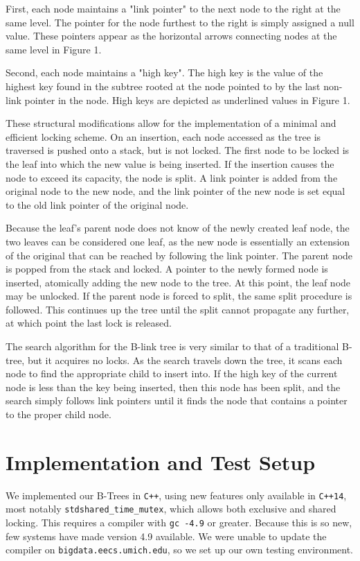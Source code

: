 \documentclass{sig-alternate}
\begin{document}
First, each node maintains a "link pointer" to the next node to the right at the same level. The pointer for the node furthest to the right is simply assigned a null value. These pointers appear as the horizontal arrows connecting nodes at the same level in Figure 1.

Second, each node maintains a "high key". The high key is the value of the highest key found in the subtree rooted at the node pointed to by the last non-link pointer in the node. High keys are depicted as underlined values in Figure 1.

These structural modifications allow for the implementation of a minimal and efficient locking scheme. On an insertion, each node accessed as the tree is traversed is pushed onto a stack, but is not locked. The first node to be locked is the leaf into which the new value is being inserted. If the insertion causes the node to exceed its capacity, the node is split. A link pointer is added from the original node to the new node, and the link pointer of the new node is set equal to the old link pointer of the original node.

Because the leaf's parent node does not know of the newly created leaf node, the two leaves can be considered one leaf, as the new node is essentially an extension of the original that can be reached by following the link pointer. The parent node is popped from the stack and locked. A pointer to the newly formed node is inserted, atomically adding the new node to the tree. At this point, the leaf node may be unlocked. If the parent node is forced to split, the same split procedure is followed. This continues up the tree until the split cannot propagate any further, at which point the last lock is released.

The search algorithm for the B-link tree is very similar to that of a traditional B-tree, but it acquires no locks. As the search travels down the tree, it scans each node to find the appropriate child to insert into. If the high key of the current node is less than the key being inserted, then this node has been split, and the search simply follows link pointers until it finds the node that contains a pointer to the proper child node.
\section{Implementation and Test Setup}
We implemented our B-Trees in \texttt{C++}, using new features only available in \texttt{C++14}, most notably \texttt{stdshared\_time\_mutex}, which allows both exclusive and shared locking.  This requires a compiler with \texttt{gc -4.9} or greater.  Because this is so new, few systems have made version 4.9 available. We were unable to update the compiler on \texttt{bigdata.eecs.umich.edu}, so we set up our own testing environment.
\end{document}
